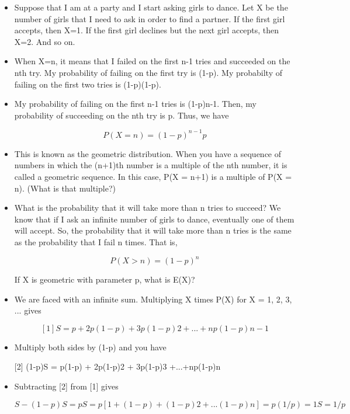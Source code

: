 \documentclass[]{report}
\begin{document}
\begin{itemize}
	\item Suppose that I am at a party and I start asking girls to dance. Let X be the number of girls that I need to ask in order to find a partner. If the first girl accepts, then X=1. If the first girl declines but the next girl accepts, then X=2. And so on. 
	
	\item When X=n, it means that I failed on the first n-1 tries and succeeded on the nth try. My probability of failing on the first try is (1-p). My probabilty of failing on the first two tries is (1-p)(1-p). 
	
	
	\item My probability of failing on the first n-1 tries is (1-p)n-1. Then, my probability of succeeding on the nth try is p. Thus, we have 
	
	\[ P(X = n) = (1-p)^{n-1}p \]
	
	\item This is known as the geometric distribution. When you have a sequence of numbers in which the (n+1)th number is a multiple of the nth number, it is called a geometric sequence. In this case, P(X = n+1) is a multiple of P(X = n). (What is that multiple?) 
	
	\item What is the probability that it will take more than n tries to succeed? We know that if I ask an infinite number of girls to dance, eventually one of them will accept. So, the probability that it will take more than n tries is the same as the probability that I fail n times. That is, 
	
	\[ P(X > n) = (1-p)^n \]
	
	If X is geometric with parameter p, what is E(X)? 
	
	\item We are faced with an infinite sum. Multiplying X times P(X) for X = 1, 2, 3, ... gives 
	
	\[
	[1] S = p + 2p(1-p) + 3p(1-p)2 +...+np(1-p)n-1 
	\]
	\item Multiply both sides by (1-p) and you have
	
	[2] (1-p)S = p(1-p) + 2p(1-p)2 + 3p(1-p)3 +...+np(1-p)n 
	
	
	\item Subtracting [2] from [1] gives 
	
	\[S - (1-p)S = pS = p[1 + (1-p) + (1-p)2 + ...(1-p)n] = p(1/p) = 1
	S = 1/p \]
	

\end{itemize}
\end{document}
